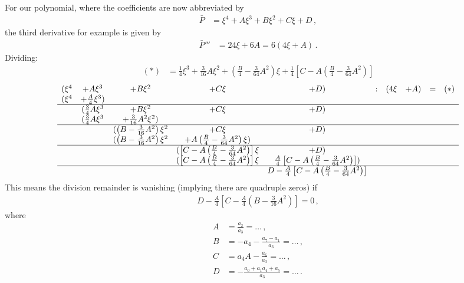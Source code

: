 \documentclass[a4paper,12pt]{article}
\begin{document}
For our polynomial, where the coefficients are now abbreviated by
\begin{align}
 \bar{P} &= \xi^4 + A \xi^3 + B \xi^2 + C \xi + D\,,
\end{align}
the third derivative for example is given by
\begin{align}
 \bar{P}''' &= 24 \xi + 6 A = 6 (4 \xi + A)\,.
\end{align}
{\tiny
Dividing:
\begin{align}
 (\ast) &= \frac{1}{4} \xi^3 + \frac{3}{16} A \xi^2 + \left(\frac{B}{4} - \frac{3}{64} A^2\right) \xi + \frac{1}{4}\left[C - A \left(\frac{B}{4} - \frac{3}{64} A^2\right)\right]
\end{align}
\begin{align}
\begin{array}{cccccccccc}
 (\xi^4 & + A \xi^3 & + B \xi^2 & + C \xi & + D) & : & (4 \xi & + A) & = & (\ast)\\
 (\xi^4 & + \frac{A}{4} \xi^3) & &         &      &   &        &      &   & \\
 \hline
	& (\frac{3}{4} A \xi^3 & + B \xi^2 & + C \xi & + D) & & &  & & \\
	& (\frac{3}{4} A \xi^3 & + \frac{3}{16} A^2 \xi^2) & & & & &  & & \\
	\hline
	& & (\left(B - \frac{3}{16} A^2\right) \xi^2 & + C \xi & + D) & & &  & &  \\
	& & (\left(B - \frac{3}{16} A^2\right) \xi^2 & + A \left(\frac{B}{4} - \frac{3}{64} A^2\right) \xi) & & & &  & &  \\
	\hline
	& & & (\left[C - A \left(\frac{B}{4} - \frac{3}{64} A^2\right)\right] \xi & +D) & & &  & &  \\
	& & & (\left[C - A \left(\frac{B}{4} - \frac{3}{64} A^2\right)\right] \xi & \frac{A}{4}\left[C - A \left(\frac{B}{4} - \frac{3}{64} A^2\right)\right]) & & &  & &  \\
	\hline
	& & & & D - \frac{A}{4}\left[C - A \left(\frac{B}{4} - \frac{3}{64} A^2\right)\right] & & &  & &
\end{array}
\end{align}
}
This means the division remainder is vanishing (implying there are quadruple zeros) if
\begin{align}
 D - \frac{A}{4}\left[C - \frac{A}{4} \left(B - \frac{3}{16} A^2\right)\right] = 0\,,
\end{align}
where
\begin{subequations}
\begin{align}
 A &= \frac{a_2}{a_3} = \dots\,,\\
 B &= - a_4 - \frac{a_7 - a_1}{a_3} = \dots\,,\\
 C &= a_4 A -\frac{a_6}{a_3} = \dots\,,\\
 D &= -\frac{a_0 + a_1 a_4 + a_5}{a_3} = \dots\,.
\end{align}
\end{subequations}
\end{document}
